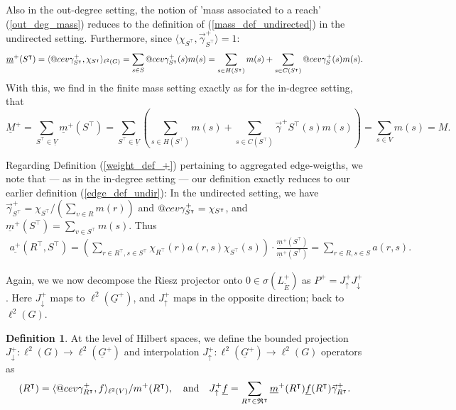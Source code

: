 \documentclass[reqno,12pt,letterpaper]{amsart}
\makeatletter
\numberwithin{equation}{section}
\newcommand{\Lout}{L^{+}}
\DeclareRobustCommand{\cev}[1]{%
	\mathpalette\do@cev{#1}%
}
\newcommand{\do@cev}[2]{%
	\fix@cev{#1}{+}%
	\reflectbox{$\m@th#1\vec{\reflectbox{$\fix@cev{#1}{-}\m@th#1#2\fix@cev{#1}{+}$}}$}%
	\fix@cev{#1}{-}%
}
\newcommand{\fix@cev}[2]{%
	\ifx#1\displaystyle
	\mkern#23mu
	\else
	\ifx#1\textstyle
	\mkern#23mu
	\else
	\ifx#1\scriptstyle
	\mkern#22mu
	\else
	\mkern#22mu
	\fi
	\fi
	\fi
}
\newcommand{\1}{\mathds{1}}
\theoremstyle{definition}
\newtheorem{Def}[Th]{Definition}
\makeatother
\begin{document}
Also in the out-degree setting, the notion of 'mass associated to a reach' (\ref{out_deg_mass}) reduces to the definition of (\ref{mass_def_undirected}) in the undirected setting. Furthermore, since $\langle \chi_{S^\intercal}, \vec{\gamma}^{+}_{S^{\intercal}}\rangle =1$:
\begin{align}
	\underline{m}^+(S^\intercal) = \langle \cev\gamma^{+}_{S^{\intercal}}, \chi_{S^\intercal} \rangle_{\ell^2(G)}
	=
	\sum\limits_{s \in S} \cev\gamma^{+}_{S^\intercal}(s) m(s) = \sum\limits_{s \in H(S^\intercal)} m(s) + \sum\limits_{s \in C(S^\intercal)} \cev\gamma^{+}_{S}(s) m(s).
\end{align}
With this, we find in the finite mass setting exactly as for the in-degree setting, that
\begin{equation}
	\underline{M}^+ = \sum\limits_{S^\intercal \in \underline{V}} \underline{m}^+(S^\intercal)
	=
	\sum\limits_{S^\intercal \in \underline{V}}
	\left(
	\sum\limits_{s \in H(S^\intercal)} m(s) + \sum\limits_{s \in C(S^\intercal)} \vec\gamma^{+}{S^\intercal}(s) m(s)
	\right)
	= \sum\limits_{s \in V} m(s)
	= M.
\end{equation}



Regarding Definition (\ref{weight_def_+}) pertaining to aggregated edge-weigths, we  note that --- as in the in-degree setting --- our definition exactly reduces to our earlier definition (\ref{edge_def_undir}): In the undirected setting, we have $	\vec{\gamma}^{+}_{S^\intercal} = \chi_{S^\intercal}/(\sum_{v \in R} m(r))$ and $	\cev{\gamma}_{S^\intercal}^{+}= \chi_{S^\intercal}$, and $\underline{m}^{+}(S^\intercal) = \sum_{v \in S^\intercal} m(s)$. Thus
\begin{align}
	\underline{a^+}(R^\intercal, S^\intercal) 
	= 	\left(\sum\limits_{r \in R^\intercal, s \in S^\intercal} 
	\chi_{R^\intercal}(r)
	a(r,s)
	\chi_{S^\intercal}(s) \right) \cdot \frac{\underline{m}^{+}(S^\intercal)}{\underline{m}^{+}(S^\intercal)}
	= 
	\sum\limits_{r \in R, s \in S} 
	a(r,s).
\end{align}




		\medskip

	Again, we we now decompose the Riesz projector onto $0 \in \sigma(\Lout_{\tilde{E}})$ as $P^+ = J^+_\uparrow J^+_\downarrow$. Here $J^+_\downarrow$ maps to  $\ell^2(\underline{G}^+)$, and $J^+_\uparrow$ maps in the opposite direction; back to $\ell^2(G)$.
	\begin{Def}\label{proj_interp_outdeg}
		At the level of Hilbert spaces, we define the bounded projection $J^+_\downarrow: \ell^2(G) \rightarrow \ell^2(\underline{G}^+)$ and interpolation $J^+_\uparrow: \ell^2(\underline{G}^+) \rightarrow \ell^2(G)$ operators as 
		\begin{align}
			[J^+_\downarrow f](R^\intercal) = \langle \cev\gamma^{+}_{R^\intercal} , f \rangle_{\ell^2(V)}/m^+(R^\intercal),\quad \text{and} \quad J^+_\uparrow \underline{f} = \sum_{R^\intercal \in \mathfrak{R}^\intercal} \underline{m}^+(R^\intercal)  \underline{f}(R^\intercal)  \vec\gamma^{+}_{R^\intercal}.
		\end{align}
	\end{Def}
\end{document}
